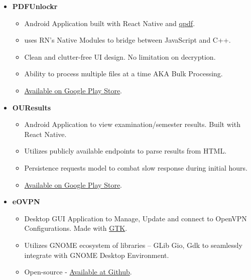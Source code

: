 \documentclass{article}
\begin{document}
\begin{itemize}
    \item \textbf{PDFUnlockr}
    \subitem
    \begin{itemize}
        \vspace{-0.25cm}
        \item Android Application built with React Native and \href{http://qpdf.sourceforge.net/}{qpdf}.
        \item uses RN's Native Modules to bridge between JavaScript and C++.
        \item Clean and clutter-free UI design. No limitation on decryption.
        \item Ability to process multiple files at a time AKA Bulk Processing.
        \item \href{https://play.google.com/store/apps/details?id=com.pdfunlockr}{Available on Google Play Store}.
        \vspace{0.35cm}
    \end{itemize}
    
    \item \textbf{OUResults}
    \subitem
    \begin{itemize}
        \vspace{-0.25cm}
        \item Android Application to view examination/semester results. Built with React Native.
        \item Utilizes publicly available endpoints to parse results from HTML.
        \item Persistence requests model to combat slow response during initial hours.
        \item \href{https://play.google.com/store/apps/details?id=com.ouresults}{Available on Google Play Store}.
        \vspace{0.35cm}
    \end{itemize}

    
    \item \textbf{eOVPN}
    \subitem
    \begin{itemize}
        \vspace{-0.25cm}
        \item Desktop GUI Application to Manage, Update and connect to OpenVPN Configurations. Made with \href{https://gtk.org/}{GTK}.
        \item Utilizes GNOME ecosystem of libraries -- GLib Gio, Gdk to seamlessly integrate with GNOME Desktop Environment.
        \item Open-source - \href{https://github.com/jkotra/eOVPN}{Available at Github}.
        \vspace{0.35cm}
    \end{itemize}
    


\end{itemize}
\end{document}
